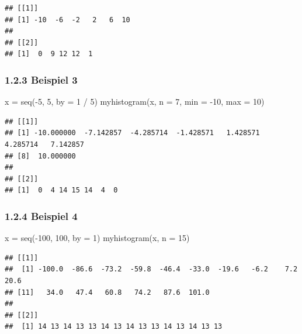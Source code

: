 \documentclass[
]{article}
\newenvironment{Shaded}{\begin{snugshade}}{\end{snugshade}}
\newcommand{\AttributeTok}[1]{\textcolor[rgb]{0.77,0.63,0.00}{#1}}
\newcommand{\DecValTok}[1]{\textcolor[rgb]{0.00,0.00,0.81}{#1}}
\newcommand{\FunctionTok}[1]{\textcolor[rgb]{0.00,0.00,0.00}{#1}}
\newcommand{\NormalTok}[1]{#1}
\newcommand{\OtherTok}[1]{\textcolor[rgb]{0.56,0.35,0.01}{#1}}
\newcommand{\SpecialCharTok}[1]{\textcolor[rgb]{0.00,0.00,0.00}{#1}}
\begin{document}
\begin{verbatim}
## [[1]]
## [1] -10  -6  -2   2   6  10
## 
## [[2]]
## [1]  0  9 12 12  1
\end{verbatim}

\hypertarget{beispiel-3}{%
\subsubsection{1.2.3 Beispiel 3}\label{beispiel-3}}

\begin{Shaded}
\begin{Highlighting}[]
\NormalTok{x }\OtherTok{=} \FunctionTok{seq}\NormalTok{(}\SpecialCharTok{{-}}\DecValTok{5}\NormalTok{, }\DecValTok{5}\NormalTok{, }\AttributeTok{by =} \DecValTok{1} \SpecialCharTok{/} \DecValTok{5}\NormalTok{)}
\FunctionTok{myhistogram}\NormalTok{(x, }\AttributeTok{n =} \DecValTok{7}\NormalTok{, }\AttributeTok{min =} \SpecialCharTok{{-}}\DecValTok{10}\NormalTok{, }\AttributeTok{max =} \DecValTok{10}\NormalTok{)}
\end{Highlighting}
\end{Shaded}

\begin{verbatim}
## [[1]]
## [1] -10.000000  -7.142857  -4.285714  -1.428571   1.428571   4.285714   7.142857
## [8]  10.000000
## 
## [[2]]
## [1]  0  4 14 15 14  4  0
\end{verbatim}

\hypertarget{beispiel-4}{%
\subsubsection{1.2.4 Beispiel 4}\label{beispiel-4}}

\begin{Shaded}
\begin{Highlighting}[]
\NormalTok{x }\OtherTok{=} \FunctionTok{seq}\NormalTok{(}\SpecialCharTok{{-}}\DecValTok{100}\NormalTok{, }\DecValTok{100}\NormalTok{, }\AttributeTok{by =} \DecValTok{1}\NormalTok{)}
\FunctionTok{myhistogram}\NormalTok{(x, }\AttributeTok{n =} \DecValTok{15}\NormalTok{)}
\end{Highlighting}
\end{Shaded}

\begin{verbatim}
## [[1]]
##  [1] -100.0  -86.6  -73.2  -59.8  -46.4  -33.0  -19.6   -6.2    7.2   20.6
## [11]   34.0   47.4   60.8   74.2   87.6  101.0
## 
## [[2]]
##  [1] 14 13 14 13 13 14 13 14 13 13 14 13 14 13 13
\end{verbatim}
\end{document}
